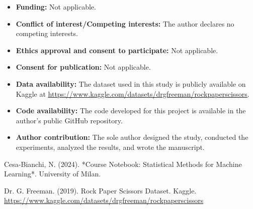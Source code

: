 \documentclass[pdflatex,sn-mathphys-num]{sn-jnl}%
\theoremstyle{thmstyleone}%
\theoremstyle{thmstyletwo}%
\theoremstyle{thmstylethree}%
\begin{document}
\begin{itemize}
\item \textbf{Funding:} Not applicable.
\item \textbf{Conflict of interest/Competing interests:} The author declares no competing interests.
\item \textbf{Ethics approval and consent to participate:} Not applicable.
\item \textbf{Consent for publication:} Not applicable.
\item \textbf{Data availability:} The dataset used in this study is publicly available on Kaggle at \url{https://www.kaggle.com/datasets/drgfreeman/rockpaperscissors}.
\item \textbf{Code availability:} The code developed for this project is available in the author's public GitHub repository.
\item \textbf{Author contribution:} The sole author designed the study, conducted the experiments, analyzed the results, and wrote the manuscript.
\end{itemize}

\begin{thebibliography}{9}

Cesa-Bianchi, N. (2024). *Course Notebook: Statistical Methods for Machine Learning*. University of Milan.

Dr. G. Freeman. (2019). Rock Paper Scissors Dataset. Kaggle. \url{https://www.kaggle.com/datasets/drgfreeman/rockpaperscissors}

\end{thebibliography}
\end{document}
